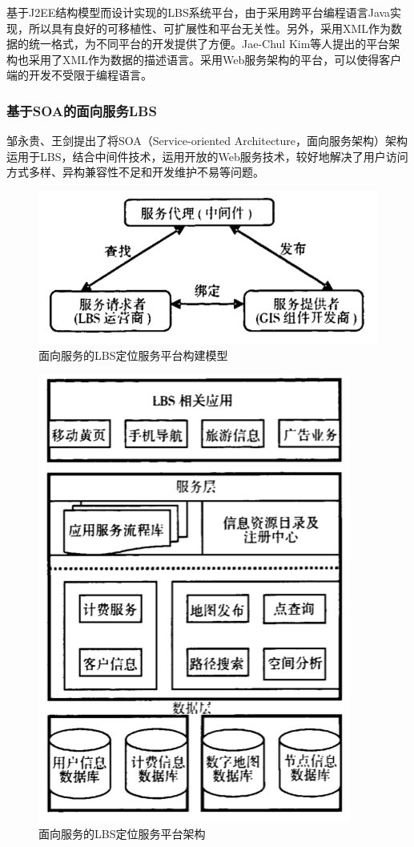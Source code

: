 \documentclass{article}
\begin{document}
\begin{CJK}{UTF8}{gbsn}
  基于J2EE结构模型而设计实现的LBS系统平台，由于采用跨平台编程语言Java实现，所以具有良好的可移植性、可扩展性和平台无关性。另外，采用XML作为数据的统一格式，为不同平台的开发提供了方便。Jae-Chul Kim等人提出的平台架构也采用了XML作为数据的描述语言\cite{L13}。采用Web服务架构的平台，可以使得客户端的开发不受限于编程语言。

	\subsubsection{基于SOA的面向服务LBS}
  邹永贵、王剑提出了将SOA（Service-oriented Architecture，面向服务架构）架构运用于LBS，结合中间件技术，运用开放的Web服务技术，较好地解决了用户访问方式多样、异构兼容性不足和开发维护不易等问题\cite{L09}。

	\begin{figure}[htbp]
		\centering
		\includegraphics[bb=0 0 544 244, scale=0.45]{figure/fig_L09-2-1.png}
		\caption{面向服务的LBS定位服务平台构建模型}
		\label{fig:L09-2-1}
	\end{figure}

	\begin{figure}[htbp]
		\centering
		\includegraphics[bb=0 0 388 559, scale=0.45]{figure/fig_L09-2-2.png}
		\caption{面向服务的LBS定位服务平台架构}
		\label{fig:L09-2-2}
	\end{figure}


\end{CJK}
\end{document}
